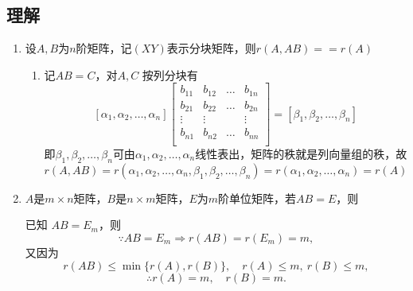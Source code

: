 \documentclass[a4paper,12pt]{article}
\begin{document}
    \subsection{理解}

    \begin{enumerate}
        \item 设$A, B$为$n$阶矩阵，记$(X Y)$表示分块矩阵，则$r(A, AB) == r(A)$
        \begin{enumerate}
            \item 记$AB = C$，对$A, C$ 按列分块有
            \[
                [\alpha_1, \alpha_2, \dots, \alpha_n]
                \begin{bmatrix}
                    b_{11} & b_{12} & \dots & b_{1n} \\
                    b_{21} & b_{22} & \dots & b_{2n} \\
                    \vdots & \vdots &       & \vdots \\
                    b_{n1} & b_{n2} & \dots & b_{nn} \\
                \end{bmatrix}
                = [\beta_1, \beta_2, \dots, \beta_n]
            \]
            即$\beta_1, \beta_2, \dots, \beta_n$可由$\alpha_1, \alpha_2, \dots, \alpha_n$线性表出，矩阵的秩就是列向量组的秩，故
            \[
                r(A, AB) = r(\alpha_1, \alpha_2, \dots, \alpha_n, \beta_1, \beta_2, \dots, \beta_n) = r(\alpha_1, \alpha_2, \dots, \alpha_n) = r(A)
            \]
        \end{enumerate}
        \item $A$是$m \times n$矩阵，$B$是$n \times m$矩阵，$E$为$m$阶单位矩阵，若$AB = E$，则{\color[rgb]{0.2, 0.6, 0.3}{$r(A) = m, r(B) = m$}}
        \begin{analysisbox}
            已知 $AB = E_m$，则
            \[
                \because AB = E_m \Rightarrow r(AB) = r(E_m) = m,
            \]
            又因为
            \[
                r(AB) \le \min\{r(A), r(B)\}, \quad r(A)\le m, \ r(B)\le m,
            \]
            \[
                \therefore r(A)=m,\quad r(B)=m.
            \]
        \end{analysisbox}
    \end{enumerate}
\end{document}
